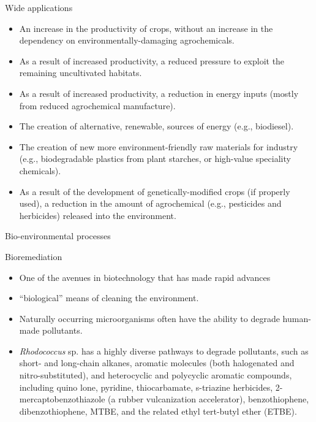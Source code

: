 \documentclass[ignorenonframetext,aspectratio=169]{beamer}
\providecommand{\tightlist}{%
  \setlength{\itemsep}{0pt}\setlength{\parskip}{0pt}}
\begin{document}
\begin{frame}{Wide applications}
\protect\hypertarget{wide-applications}{}

\begin{itemize}
\tightlist
\item
  An increase in the productivity of crops, without an increase in the
  dependency on environmentally-damaging agrochemicals.
\item
  As a result of increased productivity, a reduced pressure to exploit
  the remaining uncultivated habitats.
\item
  As a result of increased productivity, a reduction in energy inputs
  (mostly from reduced agrochemical manufacture).
\item
  The creation of alternative, renewable, sources of energy (e.g.,
  biodiesel).
\item
  The creation of new more environment-friendly raw materials for
  industry (e.g., biodegradable plastics from plant starches, or
  high-value speciality chemicals).
\item
  As a result of the development of genetically-modified crops (if
  properly used), a reduction in the amount of agrochemical (e.g.,
  pesticides and herbicides) released into the environment.
\end{itemize}

\end{frame}

\begin{frame}{Bio-environmental processes}
\protect\hypertarget{bio-environmental-processes}{}

\alert{Bioremediation}

\begin{itemize}
\tightlist
\item
  One of the avenues in biotechnology that has made rapid advances
\item
  ``biological'' means of cleaning the environment.
\item
  Naturally occurring microorganisms often have the ability to degrade
  human-made pollutants.
\item
  \emph{Rhodococcus} sp. has a highly diverse pathways to degrade
  pollutants, such as short- and long-chain alkanes, aromatic molecules
  (both halogenated and nitro-substituted), and heterocyclic and
  polycyclic aromatic compounds, including quino lone, pyridine,
  thiocarbamate, s-triazine herbicides, 2-mercaptobenzothiazole (a
  rubber vulcanization accelerator), benzothiophene, dibenzothiophene,
  MTBE, and the related ethyl tert-butyl ether (ETBE).
\end{itemize}

\end{frame}
\end{document}
